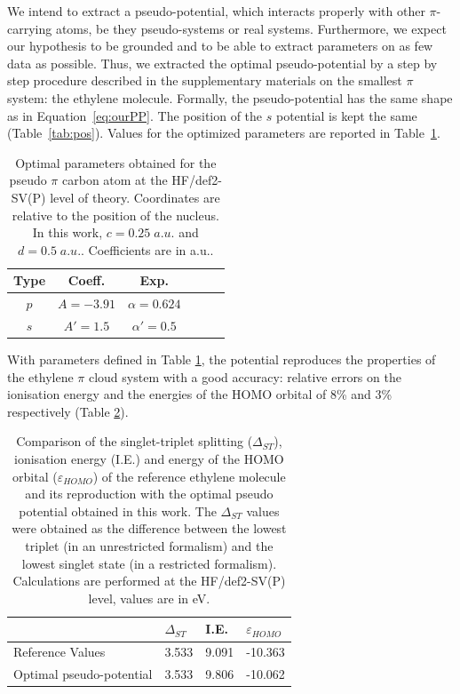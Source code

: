 \documentclass[aip,reprint]{revtex4-1}
\begin{document}
We intend to extract a pseudo-potential, which interacts properly with 
other $\pi$-carrying atoms, be they pseudo-systems or real systems.
Furthermore, we expect our hypothesis to be grounded and to be able to
extract parameters on as few data as possible.
Thus, we extracted the optimal pseudo-potential by a step by step procedure described in 
the supplementary materials on the smallest $\pi$ system: the ethylene molecule.
Formally, the pseudo-potential has the same shape as in Equation~\ref{eq:ourPP}.
The position of the $s$ potential is kept the same (Table~\ref{tab:pos}). 
Values for the optimized parameters are reported in Table~\ref{tab:params}.
\begin{table}[ht]
\caption{\label{tab:params}Optimal parameters obtained for the pseudo 
$\pi$ carbon atom at the HF/def2-SV(P) level of theory.
Coordinates are relative to the position of the nucleus.
In this work, $c=0.25\;a.u.$ and $d=0.5\;a.u.$.
Coefficients are in a.u..
}
\begin{tabular}{ccccrr}
\hline\hline
Type &  Coeff. & Exp. \\
\hline
$p$  & $A=-3.91$ & $\alpha=0.624$ \\
$s$  & $A'=1.5$   & $\alpha'=0.5$   \\
\hline\hline
\end{tabular}
\end{table}

With parameters defined in Table \ref{tab:params}, the potential reproduces the properties
of the ethylene $\pi$ cloud system with a good accuracy: relative errors on the ionisation
energy and the energies of the HOMO orbital of 8\% and 3\% respectively (Table \ref{tab:res_ourPP}).

\begin{table}[ht]
\caption{\label{tab:res_ourPP}Comparison of the
singlet-triplet splitting ($\Delta_{ST}$), ionisation
energy (I.E.) and energy of the HOMO orbital ($\varepsilon_{HOMO}$)
of the reference ethylene molecule
and its reproduction with the optimal pseudo potential obtained in this work.
The $\Delta_{ST}$ values were obtained as the difference
between the lowest triplet (in an unrestricted formalism) and the lowest singlet state
(in a restricted formalism).
Calculations are performed at the HF/def2-SV(P) level, values are in eV.}
\begin{tabular}{llll}
\hline\hline
& $\Delta_{ST}$  & I.E.  & $\varepsilon_{HOMO}$  \\
\hline
Reference Values & 3.533 & 9.091 & -10.363 \\
Optimal pseudo-potential & 3.533 & 9.806 & -10.062 \\
\hline\hline
\end{tabular}
\end{table}
\end{document}
